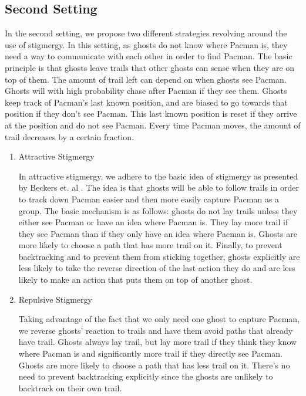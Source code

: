 \documentclass[11pt]{article}
\begin{document}
\subsection{Second Setting}
In the second setting, we propose two different strategies revolving around the use of stigmergy.  In this setting, as ghosts do not know where Pacman is, they need a way to communicate with each other in order to find Pacman. The basic principle is that ghosts leave trails that other ghosts can sense when they are on top of them. The amount of trail left can depend on when ghosts see Pacman.  Ghosts will with high probability chase after Pacman if they see them.  Ghosts keep track of Pacman's last known position, and are biased to go towards that position if they don't see Pacman.  This last known position is reset if they arrive at the position and do not see Pacman.  Every time Pacman moves, the amount of trail decreases by a certain fraction.

\begin{enumerate}[leftmargin=0.25cm]
	\item Attractive Stigmergy
	
 	In attractive stigmergy, we adhere to the basic idea of stigmergy as presented by Beckers et. al \cite{beckers1992trails}. The idea is that ghosts will be able to follow trails in order to track down Pacman easier and then more easily capture Pacman as a group.  The basic mechanism is as follows: ghosts do not lay trails unless they either see Pacman or have an idea where Pacman is.  They lay more trail if they see Pacman than if they only have an idea where Pacman is.  Ghosts are more likely to choose a path that has more trail on it.  Finally, to prevent backtracking and to prevent them from sticking together, ghosts explicitly are less likely to take the reverse direction of the last action they do and are less likely to make an action that puts them on top of another ghost.
	
	\item Repulsive Stigmergy
	
	Taking advantage of the fact that we only need one ghost to capture Pacman, we reverse ghosts' reaction to trails and have them avoid paths that already have trail.  Ghosts always lay trail, but lay more trail if they think they know where Pacman is and significantly more trail if they directly see Pacman. Ghosts are more likely to choose a path that has less trail on it.  There's no need to prevent backtracking explicitly since the ghosts are unlikely to backtrack on their own trail.
\end{enumerate}
\end{document}
